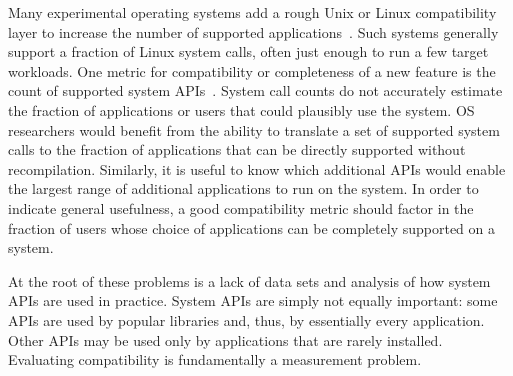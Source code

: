 Many experimental operating systems add a rough Unix or Linux compatibility 
layer to increase the number of supported applications~\citep{zeldovich+histar, aviram10determinator, xax, appavoo2003providing}.
Such systems generally support a fraction of Linux system calls,
often just enough 
to run a few target workloads.
One metric for compatibility or completeness of a new feature
is the count of supported system APIs~\citep{tsai14graphene, TxOS, baumann13bascule, bergan10dos}.
System call counts do not accurately
estimate the fraction of applications or users that could plausibly use the system.
OS researchers would benefit from
the ability to translate
a set of supported system calls 
to the fraction of applications that
can be directly supported without recompilation.  Similarly, it is useful 
to know which additional APIs would enable the largest range of additional applications to run on the system.
In order to indicate general usefulness, a 
good compatibility metric should factor in 
the fraction of users whose choice of applications can be
completely supported on a system.


At the root of these problems is a lack of data sets and analysis of
how system APIs are used in practice.
System APIs are simply not equally important: 
some APIs are used by popular libraries and, thus, by essentially every application.
Other APIs may be used only by applications that are rarely installed.
Evaluating compatibility is fundamentally a measurement problem.

